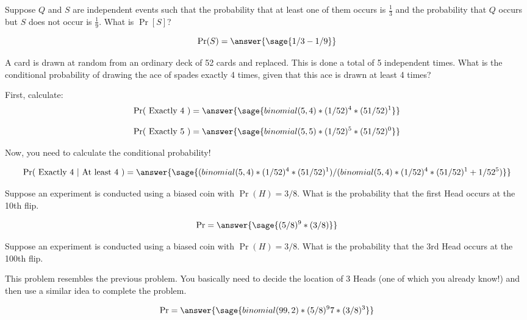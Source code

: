 \documentclass{ximera}
\begin{document}
\begin{problem}
Suppose $Q$ and $S$ are independent events such that the probability that at least one of them occurs is $\frac{1}{3}$ and the probability that $Q$ occurs but $S$ does not occur is $\frac{1}{9}$. What is $\Pr[S]$?

\begin{prompt}
$$\Pr(S)=\answer{\sage{1/3-1/9}}$$
\end{prompt}

\end{problem}

\begin{problem}
A card is drawn at random from an ordinary deck of 52 cards and replaced. This is done a total of 5 independent times. What is the conditional probability of drawing the ace of spades exactly 4 times, given that this ace is drawn at least 4 times?
\begin{hint}
First, calculate:
$$
\Pr(\text{ Exactly 4 })=\answer{\sage{binomial(5,4)*(1/52)^4*(51/52)^1}}
$$

$$
\Pr(\text{ Exactly 5 })=\answer{\sage{binomial(5,5)*(1/52)^5*(51/52)^0}}
$$

Now, you need to calculate the conditional probability!
\end{hint}

\begin{prompt}
$$
\Pr(\text{ Exactly 4 } | \text{ At least 4 })
=
\answer{
\sage{(binomial(5,4)*(1/52)^4*(51/52)^1)/(binomial(5,4)*(1/52)^4*(51/52)^1+1/52^5)}
}
$$
\end{prompt}

\end{problem}

\begin{problem}
Suppose an experiment is conducted using a biased coin with $\Pr(H)=3/8$. What is the probability that the first Head occurs at the 10th flip.

\begin{prompt}
$$
\Pr=\answer{\sage{(5/8)^9*(3/8)}}
$$
\end{prompt}

\end{problem}

\begin{problem}
Suppose an experiment is conducted using a biased coin with $\Pr(H)=3/8$. What is the probability that the 3rd Head occurs at the 100th flip.
\begin{hint}
This problem resembles the previous problem. You basically need to decide the location of 3 Heads (one of which you already know!) and then use a similar idea to complete the problem.
\end{hint}
\begin{prompt}
$$
\Pr=\answer{\sage{binomial(99,2)*(5/8)^97*(3/8)^3}}
$$
\end{prompt}

\end{problem}
\end{document}
